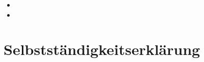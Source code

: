 \documentclass[ngerman, 12pt]{article} %
\begin{document}
\newpage


\listofattachments %

\newpage

\begin{attachment} %
    \lipsum[4] %
\end{attachment}

\begin{attachment} %
    \begin{customlistof}{0cm}{} %
        \begin{itemize}
            \item \lipsum[2] %
            \item \lipsum[2] %
        \end{itemize}
    \end{customlistof}
\end{attachment}

\printailist 

\thispagestyle{empty} %
\section*{Selbstständigkeitserklärung} %

\newpage
\listoftodos
\end{document}
